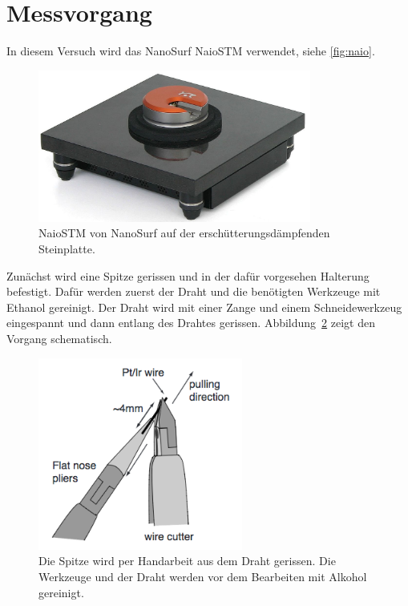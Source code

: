 \section{Messvorgang}

In diesem Versuch wird das NanoSurf NaioSTM verwendet, siehe \autoref{fig:naio}.
\begin{figure}
  \centering
  \includegraphics[width=0.8\textwidth]{./images/naiostm-zoom.jpg}
  \caption{%
    NaioSTM von NanoSurf auf der erschütterungsdämpfenden Steinplatte.~\cite{naio}
  }\label{fig:naio}
\end{figure}

Zunächst wird eine Spitze gerissen und in der dafür vorgesehen Halterung befestigt.
Dafür werden zuerst der Draht und die benötigten Werkzeuge mit Ethanol gereinigt. Der Draht wird mit einer Zange und einem Schneidewerkzeug
eingespannt und dann entlang des Drahtes gerissen. Abbildung~\ref{fig:cut} zeigt den Vorgang schematisch.

\begin{figure}
  \centering
  \includegraphics[width=0.6\textwidth]{./images/cut.png}
  \caption{%
    Die Spitze wird per Handarbeit aus dem Draht gerissen. Die Werkzeuge und der Draht werden vor dem Bearbeiten mit Alkohol gereinigt.~\cite{naio}
  }\label{fig:cut}
\end{figure}

